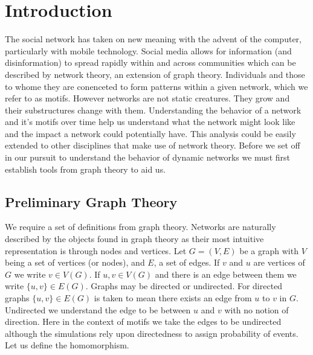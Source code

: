 %

\chapter{Introduction}

The social network has taken on new meaning with the advent of the computer, particularly with 
mobile technology. Social media allows for information (and disinformation) to spread rapidly
within and across communities which can be described by network theory, an extension of graph theory.
Individuals and those to whome they are conenceted to form patterns within a given network, which we refer to as 
motifs. However networks are not static creatures. They grow and their substructures change
with them. Understanding the behavior of a network and it's motifs over time help us understand what
the network might look like and the impact a network could potentially have. This analysis 
could be easily extended to other disciplines that make use of network theory. Before we set off in our pursuit to understand the behavior of dynamic networks we must first establish
tools from graph theory to aid us. 

\section{Preliminary Graph Theory}

We require a set of definitions from graph theory. Networks are naturally described by the 
objects found in graph theory as their most intuitive representation is through
nodes and vertices. Let $G = (V,E)$ be a graph with $V$ being a set of vertices (or nodes), 
and $E$, a set of edges. If $v$ and $u$ are vertices of $G$ we write $v \in V(G)$.
If $u,v \in V(G)$ and there is an edge between them we 
write $\{u,v\} \in E(G)$. Graphs may be directed or undirected. For directed graphs $\{u,v\} \in E(G)$
is taken to mean there exists an edge from $u$ to $v$ in $G$. Undirected we understand the 
edge to be between $u$ and $v$ with no notion of direction.
Here in the context of motifs we take the edges to be undirected although the simulations
rely upon directedness to assign probability of events. Let us define the homomorphism.

